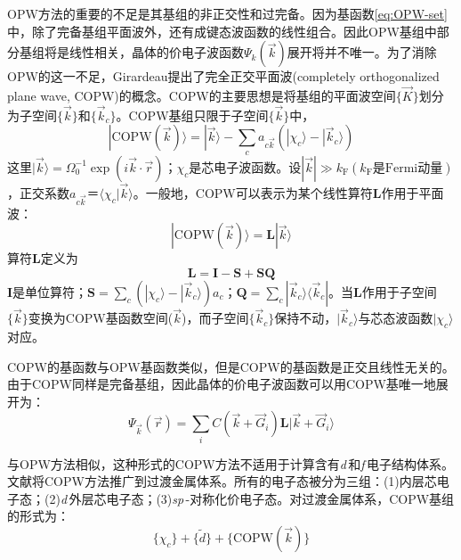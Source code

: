 OPW方法的重要的不足是其基组的非正交性和过完备。因为基函数\eqref{eq:OPW-set}中，除了完备基组平面波外，还有成键态波函数的线性组合。因此OPW基组中部分基组将是线性相关，晶体的价电子波函数$\Psi_k(\vec k)$展开将并不唯一。为了消除OPW的这一不足，Girardeau提出了完全正交平面波(completely orthogonalized plane wave, COPW)的概念\cite{JMP12-165_1971}。COPW的主要思想是将基组的平面波空间$\{\vec K\}$划分为子空间$\{\vec k\}$和$\{\vec k_c\}$。COPW基组只限于子空间$\{\vec k\}$中，
\begin{equation}
  |\mathrm{COPW}(\vec k)\rangle=|\vec k\rangle-\sum_ca_{c\vec k}(|\chi_c\rangle-|\vec k_c\rangle)
  \label{eq:COPW-set}
\end{equation}
这里$|\vec k\rangle=\Omega_0^{-1}\exp(i\vec k\cdot\vec r)$；$\chi_c$是芯电子波函数。设$|\vec k|\gg k_{\mathrm F}(k_{\mathrm F}\mbox{是Fermi动量})$，正交系数$a_{c\vec k}＝\langle\chi_c|\vec k\rangle$。一般地，COPW可以表示为某个线性算符$\mathbf L$作用于平面波：
\begin{equation}
  |\mathrm{COPW}(\vec k)\rangle=\mathbf L|\vec k\rangle
  \label{eq:solid-89}
\end{equation}
算符$\mathbf L$定义为
$$\mathbf L=\mathbf I-\mathbf S+\mathbf{SQ}$$
$\mathbf I$是单位算符；$\mathbf S=\sum\limits_c(|\chi_c\rangle-|\vec k_c\rangle)a_c$；$\mathbf Q=\sum\limits_c|\vec k_c\rangle\langle\vec k_c|$。当$\mathbf L$作用于子空间$\{\vec k\}$变换为COPW基函数空间($\vec k$)，而子空间$\{\vec k_c\}$保持不动，$|\vec k_c\rangle$与芯态波函数$|\chi_c\rangle$对应。

COPW的基函数与OPW基函数类似，但是COPW的基函数是正交且线性无关的。
由于COPW同样是完备基组，因此晶体的价电子波函数可以用COPW基唯一地展开为：
\begin{equation}
  \Psi_{\vec k}(\vec r)=\sum_iC(\vec k+\vec G_i)\mathbf L|\vec k+\vec G_i\rangle
  \label{eq:solid-90}
\end{equation}

与OPW方法相似，这种形式的COPW方法不适用于计算含有{\it d}\,和{\it f}\,电子结构体系。文献\cite{FMM50-928_1980}将COPW方法推广到过渡金属体系。所有的电子态被分为三组：(1)内层芯电子态；(2){\it d}\,外层芯电子态；(3){\it sp}\,-对称化价电子态。对过渡金属体系，COPW基组的形式为：
\begin{equation}
  \{\chi_c\}+\{\tilde d\}+\{\mathrm{COPW}(\vec k)\}
  \label{eq:solid-91}
\end{equation}


